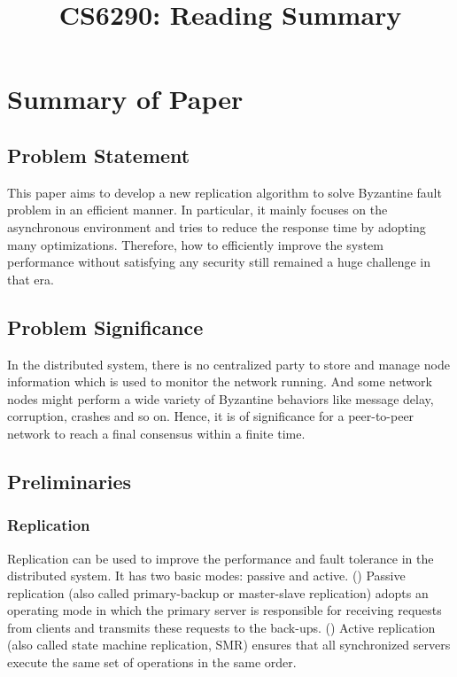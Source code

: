 \documentclass[conference]{IEEEtran}
\begin{document}
\title{CS6290: Reading Summary }

\author{
}

\maketitle

\section{Summary of Paper \cite{castro1999practical}}


\subsection{Problem Statement}
This paper aims to develop a new replication algorithm to solve Byzantine fault problem in an efficient manner.
%
In particular, it mainly focuses on the asynchronous environment and tries to reduce the response time by adopting many optimizations. 
%
Therefore, how to efficiently improve the system performance without satisfying any security still remained a huge challenge in that era.

\subsection{Problem Significance}
In the distributed system, there is no centralized party to store and manage node information which is used to monitor the network running.
%
And some network nodes might perform a wide variety of Byzantine behaviors like message delay, corruption, crashes and so on.
%
Hence, it is of significance for a peer-to-peer network to reach a final consensus within a finite time.
 
\subsection{Preliminaries}
\subsubsection{Replication} 
Replication can be used to improve the performance and fault tolerance in the distributed system.
%
It has two basic modes: passive and active.
%
() Passive replication (also called primary-backup or master-slave replication) adopts an operating mode in which the primary server is responsible for receiving requests from clients and transmits these requests to the back-ups. 
%
() Active replication (also called state machine replication, SMR) ensures that all synchronized servers execute the same set of operations in the same order.
\end{document}

